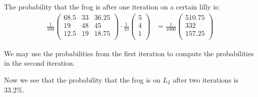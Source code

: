 \documentclass[a4paper]{article}
\begin{document}
The probability that the frog is after one iteration on a certain lilly is:
\begin{align*}
\frac{1}{100}
\left(
\begin{array}{ccc}
68.5 & 33 & 36.25 \\
19 & 48 & 45  \\
12.5 & 19 & 18.75 \\
\end{array}
\right)
\cdot
\frac{1}{10}
\left(
\begin{array}{c}
5 \\
4 \\
1 \\
\end{array}
\right)
&=
\frac{1}{1000}
\left(
\begin{array}{c}
510.75 \\
332 \\
157.25 \\
\end{array}
\right)
\end{align*}

We may use the probabilities from the first iteration to compute the probabilities in the second iteration.

Now we see that the probability that the frog is on $L_2$ after two iterations is $33.2\%$.
\end{document}
